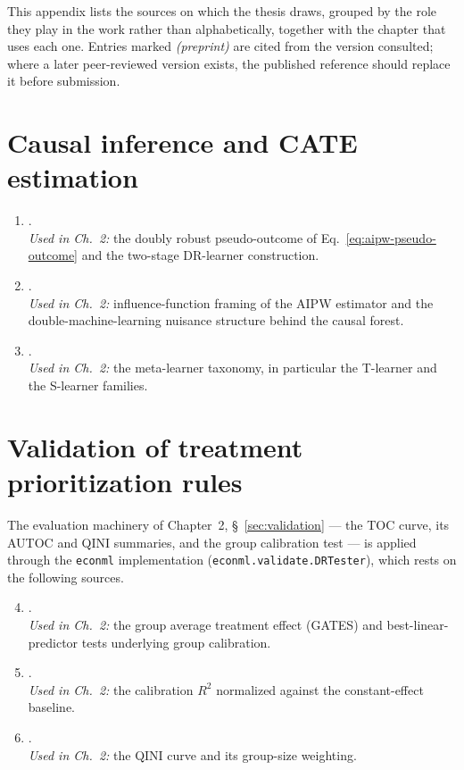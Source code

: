 
This appendix lists the sources on which the thesis draws, grouped by the role
they play in the work rather than alphabetically, together with the chapter
that uses each one. Entries marked \emph{(preprint)} are cited from the version
consulted; where a later peer-reviewed version exists, the published reference
should replace it before submission.

\section{Causal inference and CATE estimation}

\begin{enumerate}
  \item \citet{kennedy2020}.
    \\\textit{Used in Ch.~2:} the doubly robust pseudo-outcome of
    Eq.~\eqref{eq:aipw-pseudo-outcome} and the two-stage DR-learner
    construction.

  \item \citet{kennedy2023}.
    \\\textit{Used in Ch.~2:} influence-function framing of the AIPW estimator
    and the double-machine-learning nuisance structure behind the causal
    forest.

  \item \citet{salditt2024}.
    \\\textit{Used in Ch.~2:} the meta-learner taxonomy, in particular the
    T-learner and the S-learner families.
\end{enumerate}

\section{Validation of treatment prioritization rules}

The evaluation machinery of Chapter~2, \S~\ref{sec:validation} --- the TOC curve, its AUTOC and QINI
summaries, and the group calibration test --- is applied through the
\texttt{econml} implementation (\texttt{econml.validate.DRTester}), which rests
on the following sources.

\begin{enumerate}\setcounter{enumi}{3}
  \item \citet{chernozhukov2022}.
    \\\textit{Used in Ch.~2:} the group average treatment effect (GATES) and
    best-linear-predictor tests underlying group calibration.

  \item \citet{dwivedi2020}.
    \\\textit{Used in Ch.~2:} the calibration $R^2$ normalized against the
    constant-effect baseline.

  \item \citet{radcliffe2007}.
    \\\textit{Used in Ch.~2:} the QINI curve and its group-size weighting.
\end{enumerate}

